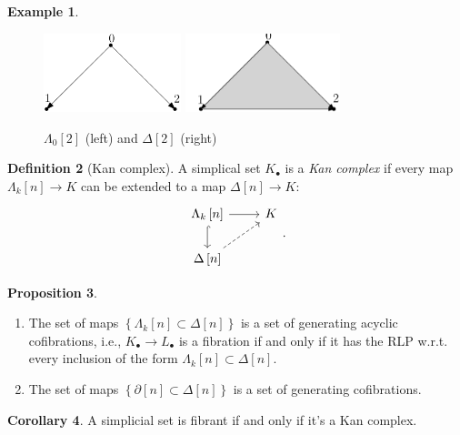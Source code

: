 \documentclass[10pt,letterpaper,cm]{nupset}
\theoremstyle{definition}
\newtheorem{defn}{Definition}[subsection]
\newtheorem{exmp}[defn]{Example}
\theoremstyle{theorem}
\newtheorem{prop}[defn]{Proposition}
\newtheorem{corollary}[defn]{Corollary}
\theoremstyle{remark}
\newcommand{\1}{\mathbb{1}}
\newcommand{\0}{\vec 0}
\newcommand{\be}{\begin{enumerate}}
\newcommand{\ee}{\end{enumerate}}
\begin{document}
\begin{exmp}\label{zhorn} $ $
\begin{figure}[H]     
\centering 
\includegraphics[width=40mm]{zero-horn.png}
\quad \quad  \scalebox{2.4}{$\hookrightarrow$} \quad  \quad 
\includegraphics[width=45mm]{two-simplex.png}
 \caption{$\Lambda_0\left[2\right]$ (left) and $\Delta\left[2\right]$ (right)}
\end{figure}
\end{exmp}

\begin{defn}[Kan complex]
A simplical set $K_{\bullet}$ is a \textit{Kan complex} if every map $\Lambda_k\left[n\right] \to K$ can be extended to a map $\Delta\left[n\right] \to K$:
\[
\begin{tikzcd}
	{\Lambda_k\left[n\right]} & K \\
	{\Delta\left[n\right]}
	\arrow[hook, from=1-1, to=2-1]
	\arrow[from=1-1, to=1-2]
	\arrow[dashed, from=2-1, to=1-2]
\end{tikzcd}
.\]
\end{defn}

\begin{prop} $ $
\be
\item The set of maps $\left\{\Lambda_k\left[n\right] \subset \Delta\left[n\right]\right\}$ is a set of generating acyclic cofibrations, i.e., $K_{\bullet} \to L_{\bullet}$ is a fibration if and only if it has the RLP w.r.t. every inclusion  of the form $\Lambda_k\left[n\right] \subset \Delta\left[n\right]$.
\item The set of maps $\left\{\partial{\left[n\right]} \subset \Delta\left[n\right]\right\}$ is a set of generating cofibrations.
\ee
\end{prop}

\begin{corollary}
A simplicial set is fibrant if and only if it's a Kan complex.
\end{corollary}
\end{document}
